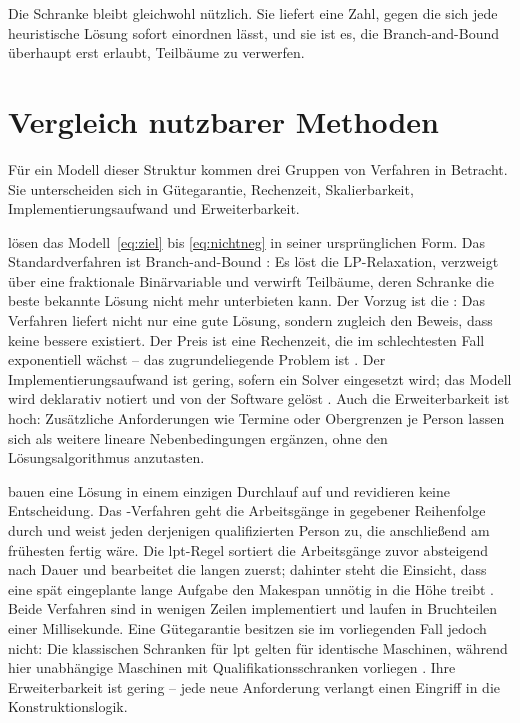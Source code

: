 Die Schranke bleibt gleichwohl nützlich. Sie liefert eine Zahl, gegen die sich
jede heuristische Lösung sofort einordnen lässt, und sie ist es, die
Branch-and-Bound überhaupt erst erlaubt, Teilbäume zu verwerfen.

\section{Vergleich nutzbarer Methoden}
\label{sec:verfahrensvergleich}

Für ein Modell dieser Struktur kommen drei Gruppen von Verfahren in Betracht.
Sie unterscheiden sich in Gütegarantie, Rechenzeit, Skalierbarkeit,
Implementierungsaufwand und Erweiterbarkeit.

 lösen das Modell~\eqref{eq:ziel} bis
\eqref{eq:nichtneg} in seiner ursprünglichen Form. Das Standardverfahren ist
Branch-and-Bound \parencite{land1960automatic}: Es löst die LP-Relaxation,
verzweigt über eine fraktionale Binärvariable und verwirft Teilbäume, deren
Schranke die beste bekannte Lösung nicht mehr unterbieten kann. Der Vorzug ist
die : Das Verfahren liefert nicht nur eine gute Lösung,
sondern zugleich den Beweis, dass keine bessere existiert. Der Preis ist eine
Rechenzeit, die im schlechtesten Fall exponentiell wächst -- das
zugrundeliegende Problem ist  \parencite{garey1979computers}.
Der Implementierungsaufwand ist gering, sofern ein Solver eingesetzt wird; das
Modell wird deklarativ notiert und von der Software gelöst \parencite{glpk}.
Auch die Erweiterbarkeit ist hoch: Zusätzliche Anforderungen wie Termine oder
Obergrenzen je Person lassen sich als weitere lineare Nebenbedingungen ergänzen,
ohne den Lösungsalgorithmus anzutasten.

 bauen eine Lösung in einem einzigen Durchlauf
auf und revidieren keine Entscheidung. Das -Verfahren geht die
Arbeitsgänge in gegebener Reihenfolge durch und weist jeden derjenigen
qualifizierten Person zu, die anschließend am frühesten fertig wäre. Die
\ac{lpt}-Regel sortiert die Arbeitsgänge zuvor absteigend nach Dauer und
bearbeitet die langen zuerst; dahinter steht die Einsicht, dass eine spät
eingeplante lange Aufgabe den Makespan unnötig in die Höhe treibt
\parencite{graham1969bounds}. Beide Verfahren sind in wenigen Zeilen
implementiert und laufen in Bruchteilen einer Millisekunde. Eine Gütegarantie
besitzen sie im vorliegenden Fall jedoch nicht: Die klassischen Schranken für
\ac{lpt} gelten für identische Maschinen, während hier unabhängige Maschinen mit
Qualifikationsschranken vorliegen \parencite{lenstra1990approximation}. Ihre
Erweiterbarkeit ist gering -- jede neue Anforderung verlangt einen Eingriff in
die Konstruktionslogik.

